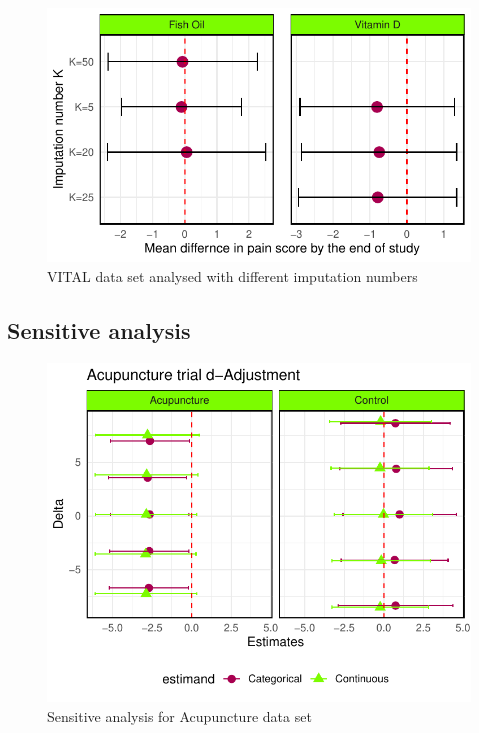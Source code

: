 \documentclass{article}
\newcommand{\pandocbounded}[1]{#1}
\begin{document}
\begin{figure}
\centering
\pandocbounded{\includegraphics[keepaspectratio]{Final_Report_files/figure-latex/unnamed-chunk-35-1.pdf}}
\caption{VITAL data set analysed with different imputation numbers}
\end{figure}

\subsection{Sensitive analysis}\label{sensitive-analysis-1}

\begin{figure}
\centering
\pandocbounded{\includegraphics[keepaspectratio]{Final_Report_files/figure-latex/unnamed-chunk-36-1.pdf}}
\caption{Sensitive analysis for Acupuncture data set}
\end{figure}
\end{document}
